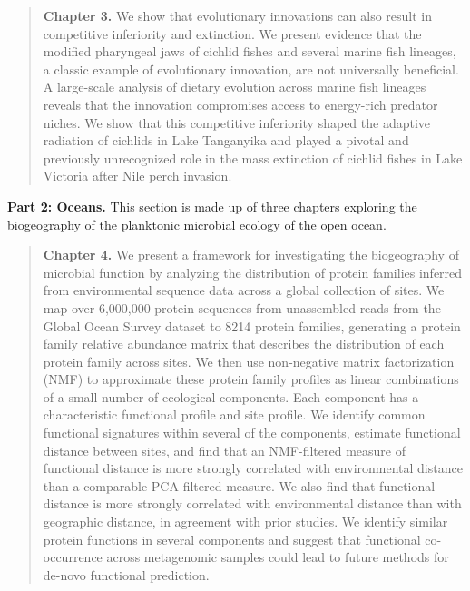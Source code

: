 \begin{quote} \noindent\textbf{Chapter 3.} We show that evolutionary innovations can
also result in competitive inferiority and extinction. We present evidence
that the modified pharyngeal jaws of cichlid fishes and several marine fish
lineages, a classic example of evolutionary innovation, are not universally
beneficial. A large-scale analysis of dietary evolution across marine fish
lineages reveals that the innovation compromises access to energy-rich
predator niches. We show that this competitive inferiority shaped the adaptive
radiation of cichlids in Lake Tanganyika and played a pivotal and previously
unrecognized role in the mass extinction of cichlid fishes in Lake Victoria
after Nile perch invasion. \end{quote}

\noindent\textbf{Part 2: Oceans.}
This section is made up of three chapters exploring the biogeography of the planktonic microbial ecology of the open ocean. %

\begin{quote} \noindent\textbf{Chapter 4.} We present a framework for
investigating the biogeography of microbial function by analyzing the
distribution of protein families inferred from environmental sequence data
across a global collection of sites. We map over 6,000,000 protein sequences
from unassembled reads from the Global Ocean Survey dataset to 8214 protein
families, generating a protein family relative abundance matrix that describes
the distribution of each protein family across sites. We then use non-negative
matrix factorization (NMF) to approximate these protein family profiles as
linear combinations of a small number of ecological components. Each component
has a characteristic functional profile and site profile. We identify common
functional signatures within several of the components, estimate functional
distance between sites, and find that an NMF-filtered measure of functional
distance is more strongly correlated with environmental distance than a
comparable PCA-filtered measure. We also find that functional distance is more
strongly correlated with environmental distance than with geographic distance,
in agreement with prior studies. We identify similar protein functions in
several components and suggest that functional co-occurrence across
metagenomic samples could lead to future methods for de-novo functional
prediction.\end{quote}

